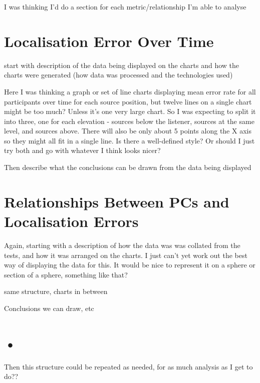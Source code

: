 I was thinking I'd do a section for each metric/relationship I'm able to analyse

\section{Localisation Error Over Time}
start with description of the data being displayed on the charts and how the charts were generated (how data was processed and the technologies used)

\bigskip

Here I was thinking a graph or set of line charts displaying mean error rate for all participants over time for each source position, but twelve lines on a single chart might be too much? Unless it's one very large chart. So I was expecting to split it into three, one for each elevation - sources below the listener, sources at the same level, and sources above. There will also be only about 5 points along the X axis so they might all fit in a single line. Is there a well-defined style? Or should I just try both and go with whatever I think looks nicer?

\bigskip 

Then describe what the conclusions can be drawn from the data being displayed

\section{Relationships Between PCs and Localisation Errors}
Again, starting with a description of how the data was was collated from the tests, and how it was arranged on the charts. I just can't yet work out the best way of displaying the data for this. It would be nice to represent it on a sphere or section of a sphere, something like that? 

\bigskip

same structure, charts in between 

\bigskip 

Conclusions we can draw, etc

\section{•}
Then this structure could be repeated as needed, for as much analysis as I get to do??